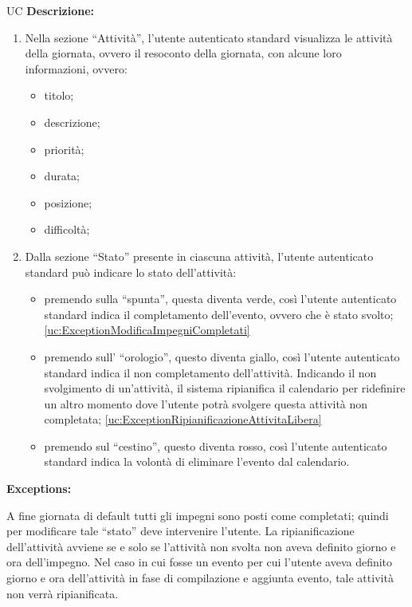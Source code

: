 \begin{listaPersonale}{UC}
    \textbf{Descrizione:}
    \begin{enumerate}
        \item Nella sezione “Attività”, l'utente autenticato standard visualizza le attività della giornata, ovvero il resoconto della giornata, con alcune loro informazioni, ovvero:
              \begin{itemize}
                  \item titolo;
                  \item descrizione;
                  \item priorità;
                  \item durata;
                  \item posizione;
                  \item difficoltà;
              \end{itemize}
        \item Dalla sezione “Stato” presente in ciascuna attività, l'utente autenticato standard può indicare lo stato dell'attività:
              \begin{itemize}
                  \item premendo sulla “spunta”, questa diventa verde, così l'utente autenticato standard indica il completamento dell'evento, ovvero che è stato svolto; \ref{uc:ExceptionModificaImpegniCompletati}
                  \item premendo sull' “orologio”, questo diventa giallo, così l'utente autenticato standard indica il non completamento dell'attività. Indicando il non svolgimento di un'attività, il sistema ripianifica il calendario per ridefinire un altro momento dove l'utente potrà svolgere questa attività non completata; \ref{uc:ExceptionRipianificazioneAttivitaLibera}
                  \item premendo sul “cestino”, questo diventa rosso, così l'utente autenticato standard indica la volontà di eliminare l'evento dal calendario.
              \end{itemize}

    \end{enumerate}



    \textbf{Exceptions:}
    \begin{enumerate}[label=\textbf{[exception \arabic{enumii}]}, ref= \textbf{[exception \arabic{enumii}]}]
         A fine giornata di default tutti gli impegni sono posti come completati; quindi per modificare tale “stato” deve intervenire l'utente.
         La ripianificazione dell'attività avviene se e solo se l'attività non svolta non aveva definito giorno e ora dell'impegno. Nel caso in cui fosse un evento per cui l'utente aveva definito giorno e ora dell'attività in fase di compilazione e aggiunta evento, tale attività non verrà ripianificata.
    \end{enumerate}







\end{listaPersonale}
